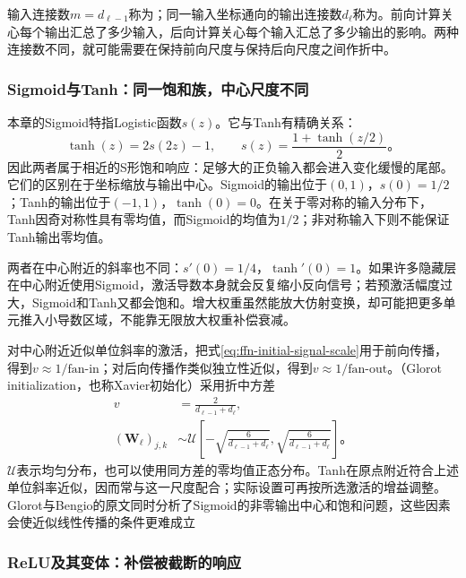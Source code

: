 输入连接数$m=d_{\ell-1}$称为；同一输入坐标通向的输出连接数$d_\ell$称为。前向计算关心每个输出汇总了多少输入，后向计算关心每个输入汇总了多少输出的影响。两种连接数不同，就可能需要在保持前向尺度与保持后向尺度之间作折中。

\subsubsection{Sigmoid与Tanh：同一饱和族，中心尺度不同}
\label{sec:ffn-initialization-saturating}

本章的Sigmoid特指Logistic函数$s(z)$。它与Tanh有精确关系：
\begin{equation}
  \tanh(z)=2s(2z)-1,\qquad
  s(z)=\frac{1+\tanh(z/2)}{2}\text{。}
  \label{eq:ffn-sigmoid-tanh-relation}
\end{equation}
因此两者属于相近的S形饱和响应：足够大的正负输入都会进入变化缓慢的尾部。它们的区别在于坐标缩放与输出中心。Sigmoid的输出位于$(0,1)$，$s(0)=1/2$；Tanh的输出位于$(-1,1)$，$\tanh(0)=0$。在关于零对称的输入分布下，Tanh因奇对称性具有零均值，而Sigmoid的均值为$1/2$；非对称输入下则不能保证Tanh输出零均值。

两者在中心附近的斜率也不同：$s'(0)=1/4$，$\tanh'(0)=1$。如果许多隐藏层在中心附近使用Sigmoid，激活导数本身就会反复缩小反向信号；若预激活幅度过大，Sigmoid和Tanh又都会饱和。增大权重虽然能放大仿射变换，却可能把更多单元推入小导数区域，不能靠无限放大权重补偿衰减。

对中心附近近似单位斜率的激活，把式\eqref{eq:ffn-initial-signal-scale}用于前向传播，得到$v\approx1/\mathrm{fan\text{-}in}$；对后向传播作类似独立性近似，得到$v\approx1/\mathrm{fan\text{-}out}$。（Glorot initialization，也称Xavier初始化）采用折中方差
\begin{equation}
  \begin{aligned}
    v&=\frac{2}{d_{\ell-1}+d_\ell},\\
    (\bm{W}_\ell)_{j,k}&\sim
    \mathcal{U}\!\left[-\sqrt{\frac{6}{d_{\ell-1}+d_\ell}},
    \sqrt{\frac{6}{d_{\ell-1}+d_\ell}}\right]\text{。}
  \end{aligned}
  \label{eq:ffn-glorot-initialization}
\end{equation}
$\mathcal{U}$表示均匀分布，也可以使用同方差的零均值正态分布。Tanh在原点附近符合上述单位斜率近似，因而常与这一尺度配合；实际设置可再按所选激活的增益调整。Glorot与Bengio的原文同时分析了Sigmoid的非零输出中心和饱和问题，这些因素会使近似线性传播的条件更难成立

\subsubsection{ReLU及其变体：补偿被截断的响应}
\label{sec:ffn-initialization-rectifiers}

